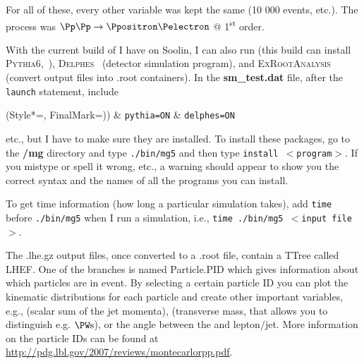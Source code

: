 For all of these, every other variable was kept the same (10 000 events, etc.). The process was $\Pp\Pp \rightarrow \Ppositron \Pelectron$ @ 1\textsuperscript{st} order.

With the current build of \madgraph I have on Soolin, I can also run \PYTHIA (this build can install \textsc{Pythia6},~\cite{Sjostrand:2007pythia}), \textsc{Delphes}~\cite{Ovyn:2009delphes} (detector simulation program), and \textsc{ExRootAnalysis} (convert output files into .root containers). In the \textbf{sm\_test.dat} file, after the \texttt{launch} statement, include

\begin{easylist}
\ListProperties(Style*=, FinalMark={)})
& \texttt{pythia=ON}
& \texttt{delphes=ON}
\end{easylist}

etc., but I have to make sure they are installed. To install these packages, go to the \textbf{/mg} directory and type \texttt{./bin/mg5} and then type \texttt{install $<$program$>$}. If you mistype or spell it wrong, etc., a warning should appear to show you the correct syntax and the names of all the programs you can install.

To get time information (how long a particular simulation takes), add \texttt{time} before \texttt{./bin/mg5} when I run a simulation, i.e., \texttt{time ./bin/mg5 $<$input file$>$}.

The .lhe.gz output files, once converted to a .root file, contain a TTree called LHEF. One of the branches is named Particle.PID which gives information about which particles are in event. By selecting a certain particle ID you can plot the kinematic distributions for each particle and create other important variables, e.g., \HT (scalar sum of the jet momenta), \mT (transverse mass, that allows you to distinguish e.g. $\PW\text{s}$), or the angle between the \etmiss and lepton/jet. More information on the particle IDs can be found at \url{http://pdg.lbl.gov/2007/reviews/montecarlorpp.pdf}.

